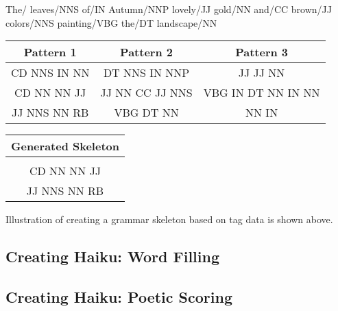 The/ leaves/NNS of/IN Autumn/NNP lovely/JJ gold/NN and/CC brown/JJ colors/NNS painting/VBG the/DT landscape/NN 

\begin{table}
	\centering
	\begin{tabular}{|c|c|c|}
		\hline Pattern 1 & Pattern 2 & Pattern 3 \\
		\hline CD NNS IN NN & DT NNS IN NNP & JJ JJ NN \\ 
		 CD NN NN JJ & JJ NN CC JJ NNS & VBG IN DT NN IN NN \\ 
		 JJ NNS NN RB & VBG DT NN & NN IN\\ 
		\hline
	\end{tabular} 
	
	\begin{tabular}{|c|}
			\hline Generated Skeleton \\
			\hline  \\ 
			  CD NN NN JJ  \\ 
			  JJ NNS NN RB \\ 
			\hline
		\end{tabular} 
\end{table}


Illustration of creating a grammar skeleton based on tag data is shown above. 

\subsection{Creating Haiku: Word Filling}



\subsection{Creating Haiku: Poetic Scoring}